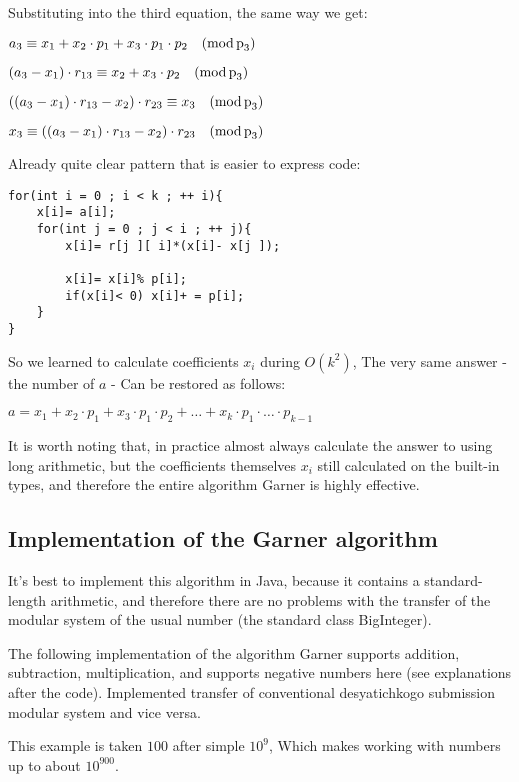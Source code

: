 Substituting into the third equation, the same way we get:

$a_{3}\equiv x_{1}+x_{2}\cdot p_{1}+x_{3}\cdot p_{1}\cdot p_{2}\quad({\rm mod\, p}_{3})$

$(a_{3}-x_{1})\cdot r_{13}\equiv x_{2}+x_{3}\cdot p_{2}\quad({\rm mod\, p}_{3})$

$((a_{3}-x_{1})\cdot r_{13}-x_{2})\cdot r_{23}\equiv x_{3}\quad({\rm mod\, p}_{3})$

$x_{3}\equiv((a_{3}-x_{1})\cdot r_{13}-x_{2})\cdot r_{23}\quad({\rm mod\, p}_{3})$

Already quite clear pattern that is easier to express code:

\begin{verbatim}
for(int i = 0 ; i < k ; ++ i){
    x[i]= a[i];
    for(int j = 0 ; j < i ; ++ j){
        x[i]= r[j ][ i]*(x[i]- x[j ]);
 
        x[i]= x[i]% p[i];
        if(x[i]< 0) x[i]+ = p[i];
    }
} 
\end{verbatim}
So we learned to calculate coefficients $x_i$ during $O (k ^ 2)$, The very same answer - the number of $a$ - Can be restored as follows:

$a=x_{1}+x_{2}\cdot p_{1}+x_{3}\cdot p_{1}\cdot p_{2}+\ldots+x_{k}\cdot p_{1}\cdot\ldots\cdot p_{k-1}$

It is worth noting that, in practice almost always calculate the answer to using long arithmetic, but the coefficients themselves $x_i$ still calculated on the built-in types, and therefore the entire algorithm Garner is highly effective.

\subsection{ Implementation of the Garner algorithm }

It's best to implement this algorithm in Java, because it contains a standard-length arithmetic, and therefore there are no problems with the transfer of the modular system of the usual number (the standard class BigInteger).

The following implementation of the algorithm Garner supports addition, subtraction, multiplication, and supports negative numbers here (see explanations after the code). Implemented transfer of conventional desyatichkogo submission modular system and vice versa.

This example is taken $100$ after simple $10 ^ 9$, Which makes working with numbers up to about $10 ^ {900}$.

